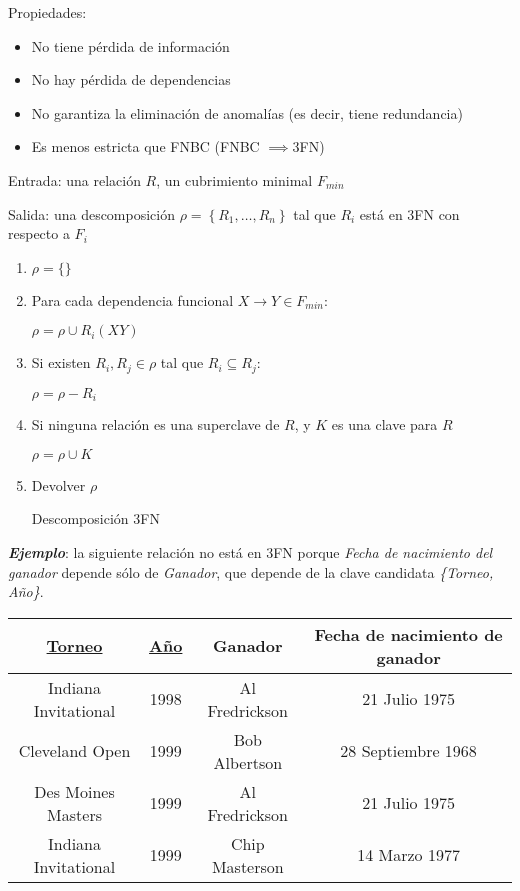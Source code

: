 \documentclass[a4paper, twoside]{article}
\begin{document}
Propiedades:
\begin{itemize}
\item No tiene pérdida de información
\item No hay pérdida de dependencias
\item No garantiza la eliminación de anomalías (es decir, tiene redundancia)
\item Es menos estricta que FNBC (FNBC $\implies$3FN)
\end{itemize}
\begin{algorithm}[H]
Entrada: una relación $R$, un cubrimiento minimal $F_{min}$

Salida: una descomposición $\rho=\left\{ R_{1},\ldots,R_{n}\right\} $
tal que $R_{i}$ está en 3FN con respecto a $F_{i}$
\begin{enumerate}
\item $\rho=\{\}$
\item Para cada dependencia funcional $X\to Y\in F_{min}$:


$\rho=\rho\cup R_{i}\left(XY\right)$

\item Si existen $R_{i},R_{j}\in\rho$ tal que $R_{i}\subseteq R_{j}$:


$\rho=\rho-R_{i}$

\item Si ninguna relación es una superclave de $R$, y $K$ es una clave
para $R$


$\rho=\rho\cup K$

\item Devolver $\rho$\protect\caption{Descomposición 3FN}
\end{enumerate}
\end{algorithm}


\textbf{\emph{Ejemplo}}: la siguiente relación no está en 3FN porque
\emph{Fecha de nacimiento del ganador} depende sólo de \emph{Ganador},
que depende de la clave candidata \emph{\{Torneo, Año\}}.

\noindent \begin{center}
\begin{tabular}{|c|c|c|c|}
\hline 
\uline{Torneo} & \uline{Año} & Ganador & Fecha de nacimiento de ganador\\
\hline 
\hline 
Indiana Invitational  & 1998 & Al Fredrickson  & 21 Julio 1975\\
\hline 
Cleveland Open  & 1999 & Bob Albertson  & 28 Septiembre 1968\\
\hline 
Des Moines Masters  & 1999 & Al Fredrickson  & 21 Julio 1975\\
\hline 
Indiana Invitational  & 1999 & Chip Masterson  & 14 Marzo 1977\\
\hline 
\end{tabular}
\par\end{center}
\end{document}
